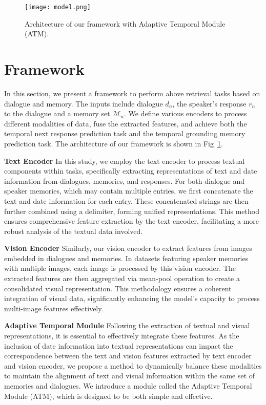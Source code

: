 \begin{figure}[t]
\centering
\texttt{[image: model.png]}
\vspace{-2mm}
\caption{Architecture of our framework with Adaptive Temporal Module (ATM).
}
\label{model}
\vspace{-4mm}
\end{figure}
\vspace{-2mm}
\section{Framework}
In this section, we present a framework to perform above retrieval tasks based on dialogue and memory. The inputs include dialogue ${d}_n$, the speaker's response ${r}_n$ to the dialogue and a memory set $\mathcal{M}_n$. We define various encoders to process different modalities of data, fuse the extracted features, and achieve both the temporal next response prediction task and the temporal grounding memory prediction task. The architecture of our framework is shown in Fig~\ref{model}.

\textbf{Text Encoder}
In this study, we employ the text encoder to process textual components within tasks, specifically extracting representations of text and date information from dialogues, memories, and responses. For both dialogue and speaker memories, which may contain multiple entries, we first concatenate the text and date information for each entry. These concatenated strings are then further combined using a delimiter, forming unified representations. This method ensures comprehensive feature extraction by the text encoder, facilitating a more robust analysis of the textual data involved.

\textbf{Vision Encoder}
Similarly, our vision encoder to extract features from images embedded in dialogues and memories. In datasets featuring speaker memories with multiple images, each image is processed by this vision encoder. The extracted features are then aggregated via mean-pool operation to create a consolidated visual representation. This methodology ensures a coherent integration of visual data, significantly enhancing the model's capacity to process multi-image features effectively.

\textbf{Adaptive Temporal Module}
Following the extraction of textual and visual representations, it is essential to effectively integrate these features. As the inclusion of date information into textual representations can impact the correspondence between the text and vision features extracted by text encoder and vision encoder, we propose a method to dynamically balance these modalities to maintain the alignment of text and visual information within the same set of memories and dialogues. We introduce a module called the Adaptive Temporal Module (ATM), which is designed to be both simple and effective.

